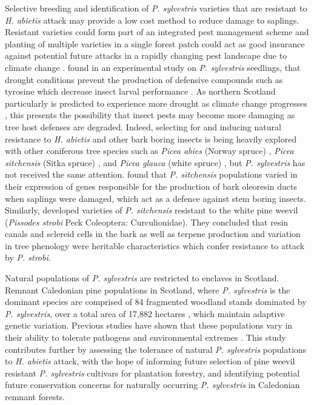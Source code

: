 \documentclass[a4paper, 11pt]{article}
\begin{document}
Selective breeding and identification of \textit{P. sylvestris} varieties that are resistant to \textit{H. abietis} attack may provide a low cost method to reduce damage to saplings. Resistant varieties could form part of an integrated pest management scheme \citep{Telford2014} and planting of multiple varieties in a single forest patch could act as good insurance against potential future attacks in a rapidly changing pest landscape due to climate change \citep{Alfaro2014}. \citet{MacAllister2019} found in an experimental study on \textit{P. sylvestris} seedlings, that drought conditions prevent the production of defensive compounds such as tyrosine which decrease insect larval performance \citep{Lokvam2006}. As northern Scotland particularly is predicted to experience more drought as climate change progresses \citep{Gosling2014}, this presents the possibility that insect pests may become more damaging as tree host defenses are degraded. Indeed, selecting for and inducing natural resistance to \textit{H. abietis} and other bark boring insects is being heavily explored with other coniferous tree species such as \textit{Picea abies} (Norway spruce) \citep{Eyles2009, Schiebe2012}, \textit{Picea sitchensis} (Sitka spruce) \citep{King2011}, and \textit{Picea glauca} (white spruce) \citep{Kiss1991}, but \textit{P. sylvestris} has not received the same attention. \citet{Byun2006} found that \textit{P. sitchensis} populations varied in their expression of genes responsible for the production of bark oleoresin ducts when saplings were damaged, which act as a defence against stem boring insects. Similarly, \citet{Alfaro2013} developed varieties of \textit{P. sitchensis} resistant to the white pine weevil (\textit{Pissodes strobi} Peck Coleoptera: Curculionidae). They concluded that resin canals and sclereid cells in the bark as well as terpene production and variation in tree phenology were heritable characteristics which confer resistance to attack by \textit{P. strobi}.

Natural populations of \textit{P. sylvestris} are restricted to enclaves in Scotland. Remnant Caledonian pine populations in Scotland, where \textit{P. sylvestris} is the dominant species \citep{Edwards2006} are comprised of 84 fragmented woodland stands dominated by \textit{P. sylvestris}, over a total area of 17,882 hectares \citep{Mason2004}, which maintain adaptive genetic variation. Previous studies have shown that these populations vary in their ability to tolerate pathogens \citep{Perry2016} and environmental extremes \citep{Salmela2013}. This study contributes further by assessing the tolerance of natural \textit{P. sylvestris} populations to \textit{H. abietis} attack, with the hope of informing future selection of pine weevil resistant \textit{P. sylvestris} cultivars for plantation forestry, and identifying potential future conservation concerns for naturally occurring \textit{P. sylvestris} in Caledonian remnant forests. 
\end{document}
